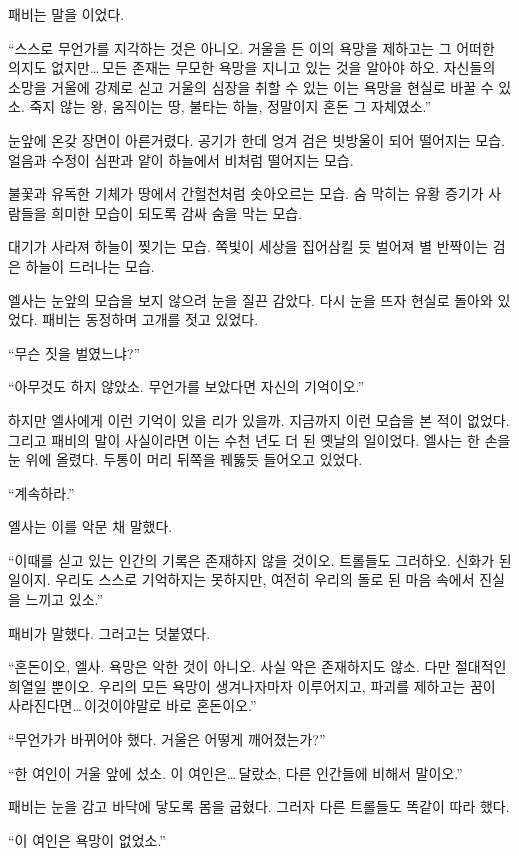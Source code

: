 패비는 말을 이었다.

``스스로 무언가를 지각하는 것은 아니오. 거울을 든 이의 욕망을 제하고는 그 어떠한 의지도 없지만\ldots\,모든 존재는 무모한 욕망을 지니고 있는 것을 알아야 하오. 자신들의 소망을 거울에 강제로 싣고 거울의 심장을 취할 수 있는 이는 욕망을 현실로 바꿀 수 있소. 죽지 않는 왕, 움직이는 땅, 불타는 하늘, 정말이지 혼돈 그 자체였소.''

눈앞에 온갖 장면이 아른거렸다. 공기가 한데 엉겨 검은 빗방울이 되어 떨어지는 모습. 얼음과 수정이 심판과 앝이 하늘에서 비처럼 떨어지는 모습.

불꽃과 유독한 기체가 땅에서 간헐천처럼 솟아오르는 모습. 숨 막히는 유황 증기가 사람들을 희미한 모습이 되도록 감싸 숨을 막는 모습.

대기가 사라져 하늘이 찢기는 모습. 쪽빛이 세상을 집어삼킬 듯 벌어져 별 반짝이는 검은 하늘이 드러나는 모습.

엘사는 눈앞의 모습을 보지 않으려 눈을 질끈 감았다. 다시 눈을 뜨자 현실로 돌아와 있었다. 패비는 동정하며 고개를 젓고 있었다.

``무슨 짓을 벌였느냐?''

``아무것도 하지 않았소. 무언가를 보았다면 자신의 기억이오.''

하지만 엘사에게 이런 기억이 있을 리가 있을까. 지금까지 이런 모습을 본 적이 없었다. 그리고 패비의 말이 사실이라면 이는 수천 년도 더 된 옛날의 일이었다. 엘사는 한 손을 눈 위에 올렸다. 두통이 머리 뒤쪽을 꿰뚫듯 들어오고 있었다.

``계속하라.''

엘사는 이를 악문 채 말했다.

``이때를 싣고 있는 인간의 기록은 존재하지 않을 것이오. 트롤들도 그러하오. 신화가 된 일이지. 우리도 스스로 기억하지는 못하지만, 여전히 우리의 돌로 된 마음 속에서 진실을 느끼고 있소.''

패비가 말했다. 그러고는 덧붙였다.

``혼돈이오, 엘사. 욕망은 악한 것이 아니오. 사실 악은 존재하지도 않소. 다만 절대적인 희열일 뿐이오. 우리의 모든 욕망이 생겨나자마자 이루어지고, 파괴를 제하고는 꿈이 사라진다면\ldots\,이것이야말로 바로 혼돈이오.''

``무언가가 바뀌어야 했다. 거울은 어떻게 깨어졌는가?''

``한 여인이 거울 앞에 섰소. 이 여인은\ldots\,달랐소, 다른 인간들에 비해서 말이오.''

패비는 눈을 감고 바닥에 닿도록 몸을 굽혔다. 그러자 다른 트롤들도 똑같이 따라 했다.

``이 여인은 욕망이 없었소.''

